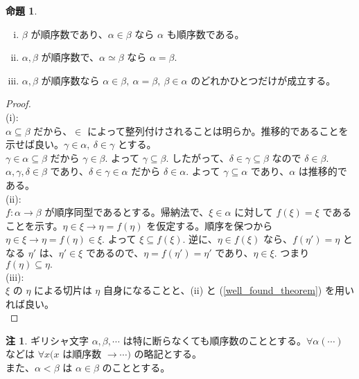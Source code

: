 \documentclass{jsarticle}
\theoremstyle{definition}
\newtheorem{proposition}[theorem]{命題}
\newtheorem*{remark*}{注}
\begin{document}
    \begin{proposition} \label{ordinal_basic_1} \
        \begin{enumerate}[(i)]
            \item $\beta$ が順序数であり、$\alpha \in \beta$ なら $\alpha$ も順序数である。
            \item $\alpha, \beta$ が順序数で、$\alpha \simeq \beta$ なら $\alpha = \beta.$
            \item $\alpha, \beta$ が順序数なら $\alpha \in \beta, \ \alpha = \beta, \ \beta \in \alpha$ のどれかひとつだけが成立する。
        \end{enumerate}   
    \end{proposition}
    \begin{proof} \ \\
        (i): \\
        $\alpha \subseteq \beta$ だから、$\in$ によって整列付けされることは明らか。推移的であることを示せば良い。$\gamma \in \alpha, \ \delta \in \gamma$ とする。\\
        $\gamma \in \alpha \subseteq \beta$ だから $\gamma \in \beta.$ よって $\gamma \subseteq \beta.$ したがって、$\delta \in \gamma \subseteq \beta$ なので $\delta \in \beta.$ \\
        $\alpha, \gamma, \delta \in \beta$ であり、$\delta \in \gamma \in \alpha$ だから $\delta \in \alpha.$ よって $\gamma \subseteq \alpha$ であり、$\alpha$ は推移的である。\\
        (ii): \\
        $f: \alpha \rightarrow \beta$ が順序同型であるとする。帰納法で、$\xi \in \alpha$ に対して $f(\xi) = \xi$ であることを示す。$\eta \in \xi \rightarrow \eta = f(\eta)$ を仮定する。順序を保つから $\eta \in \xi \rightarrow \eta = f(\eta) \in \xi.$ よって $\xi \subseteq f(\xi).$ 逆に、$\eta \in f(\xi)$ なら、$f(\eta') = \eta$ となる $\eta'$ は、$\eta' \in \xi$ であるので、$\eta = f(\eta') = \eta'$ であり、$\eta \in \xi.$ つまり $f(\eta) \subseteq \eta.$\\
        (iii): \\
        $\xi$ の $\eta$ による切片は $\eta$ 自身になることと、(ii) と (\ref{well_found_theorem}) を用いれば良い。\\
    \end{proof}
    \vspace{1ex}
    
    \begin{remark*}
        ギリシャ文字 $\alpha, \beta, \cdots$ は特に断らなくても順序数のこととする。$\forall \alpha (\cdots)$ などは $\forall x (x$ は順序数 $\rightarrow \cdots)$ の略記とする。\\
        また、$\alpha < \beta$ は $\alpha \in \beta$ のこととする。
    \end{remark*}
    
\end{document}
